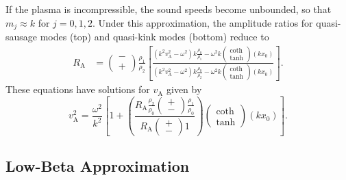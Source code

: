 \documentclass[12pt]{../style-files/ociamthesis}
\begin{document}
If the plasma is incompressible, the sound speeds become unbounded, so that $m_j \approx k$ for $j = 0, 1, 2$. Under this approximation, the amplitude ratios for quasi-sausage modes (top) and quasi-kink modes (bottom) reduce to
\begin{align}
R_\textrm{A} &= \left(\substack{- \\ +}\right) \frac{\rho_1}{\rho_2} \left[ \frac{(k^2v_\textrm{A}^2 - \omega^2)k\frac{\rho_0}{\rho_1} - \omega^2k \left(\begin{matrix} \coth \\ \tanh \end{matrix}\right)(kx_0)}{(k^2v_\textrm{A}^2-\omega^2)k\frac{\rho_0}{\rho_2}-\omega^2k \left(\begin{matrix} \coth \\ \tanh \end{matrix}\right)(kx_0)} \right].
\end{align}
These equations have solutions for $v_\textrm{A}$ given by
\begin{equation}
v_\textrm{A}^2 = \frac{\omega^2}{k^2} \left[ 1 + \left( \frac{R_\textrm{A} \frac{\rho_2}{\rho_0} \left(\substack{+ \\ -}\right) \frac{\rho_1}{\rho_0}}{R_\textrm{A} \left(\substack{+ \\ -}\right) 1} \right) \left(\begin{matrix} \coth \\ \tanh \end{matrix}\right) (kx_0)\right].
\end{equation}


\subsection{Low-Beta Approximation} \label{sec: AR low-beta}
\end{document}
